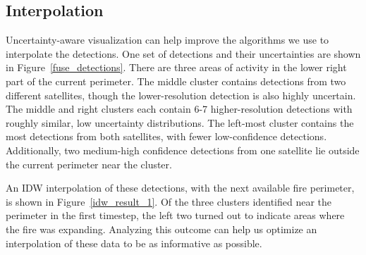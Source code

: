 \subsection{Interpolation}
\label{interpolation}

Uncertainty-aware visualization can help improve the algorithms we use to interpolate the detections. One set of detections and their uncertainties are shown in Figure~\ref{fuse_detections}. There are three areas of activity in the lower right part of the current perimeter. The middle cluster contains detections from two different satellites, though the lower-resolution detection is also highly uncertain. The middle and right clusters each contain 6-7 higher-resolution detections with roughly similar, low uncertainty distributions. The left-most cluster contains the most detections from both satellites, with fewer low-confidence detections. Additionally, two medium-high confidence detections from one satellite lie outside the current perimeter near the cluster. 

An IDW interpolation of these detections, with the next available fire perimeter, is shown in Figure~\ref{idw_result_1}.  Of the three clusters identified near the perimeter in the first timestep, the left two turned out to indicate areas where the fire was expanding. Analyzing this outcome can help us optimize an interpolation of these data to be as informative as possible.

